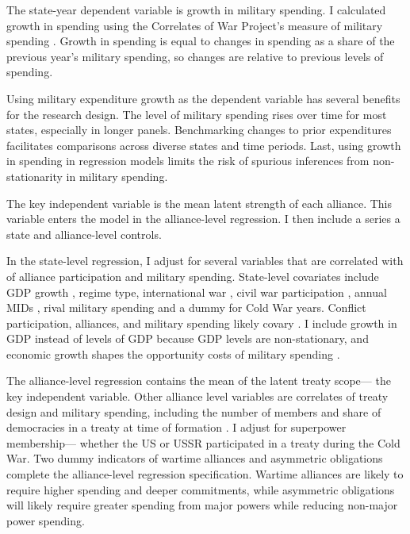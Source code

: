 \documentclass[12pt]{article}
\begin{document}
The state-year dependent variable is growth in military spending.
I calculated growth in spending using the Correlates of War Project's measure of military spending \citep{SingerCINC1988}. 
Growth in spending is equal to changes in spending as a share of the previous year's military spending, so changes are relative to previous levels of spending. 


Using military expenditure growth as the dependent variable has several benefits for the research design. 
The level of military spending rises over time for most states, especially in longer panels. 
Benchmarking changes to prior expenditures facilitates comparisons across diverse states and time periods. 
Last, using growth in spending in regression models limits the risk of spurious inferences from non-stationarity in military spending.


The key independent variable is the mean latent strength of each alliance. 
This variable enters the model in the alliance-level regression. 
I then include a series a state and alliance-level controls. 


In the state-level regression, I adjust for several variables that are correlated with of alliance participation and military spending. 
State-level covariates include GDP growth \citep{Boltetal2018}, regime type, international war \citep{Reiteretal2016}, civil war participation \citep{SarkeesWayman2010}, annual MIDs \citep{Gibleretal2016}, rival military spending \citep{ThompsonDreyer2012} and a dummy for Cold War years.
Conflict participation, alliances, and military spending likely covary \citep{SeneseVasquez2008}. 
I include growth in GDP instead of levels of GDP because GDP levels are non-stationary, and economic growth shapes the opportunity costs of military spending \citep{Kimball2010, Zielinskietal2017}.


The alliance-level regression contains the mean of the latent treaty scope--- the key independent variable. 
Other alliance level variables are correlates of treaty design and military spending, including the number of members and share of democracies in a treaty at time of formation \citep{Chibaetal2015}.
I adjust for superpower membership--- whether the US or USSR participated in a treaty during the Cold War. 
Two dummy indicators of wartime alliances and asymmetric obligations \citep{Leedsetal2002} complete the alliance-level regression specification. 
Wartime alliances are likely to require higher spending and deeper commitments, while asymmetric obligations will likely require greater spending from major powers while reducing non-major power spending. 
\end{document}
